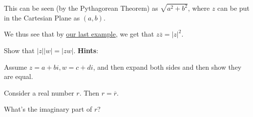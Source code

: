 \documentclass[11pt,titlepage]{scrartcl}
\newenvironment{hint}{\footnotesize \normalfont \textbf{Hints}:}{\hspace{-0.5ex}}
\begin{document}
\begin{remark}
This can be seen (by the Pythagorean Theorem) as $\sqrt{a^2+b^2}$, where $z$ can be put in the Cartesian Plane as $(a,b)$.
\end{remark}
We thus see that by \hyperlink{hmm}{our last example}, we get that $z\overline z=|z|^2$.
\begin{exercisebox}
\begin{exercise}
Show that $|z||w|=|zw|$.
\begin{hint}
\begin{addhint}{
Assume $z=a+bi,w=c+di$, and then expand both sides and then show they are equal.
}\end{addhint}
\end{hint}
\end{exercise}
\begin{exercise}\label{rm}
Consider a real number $r$. Then $r=\overline r.$
\begin{addhint}{
What's the imaginary part of $r$?
}\end{addhint}
\end{exercise}
\end{exercisebox}
\end{document}
